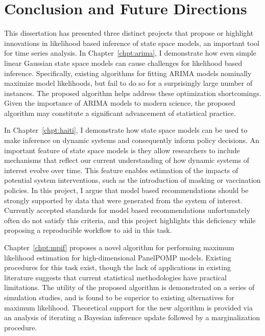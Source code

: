 \chapter{Conclusion and Future Directions}
\label{chpt:conclusion}

This dissertation has presented three distinct projects that propose or highlight innovations in likelihood based inference of state space models, an important tool for time series analysis.
In Chapter~\ref{chpt:arima}, I demonstrate how even simple linear Gaussian state space models can cause challenges for likelihood based inference.
Specifically, existing algorithms for fitting ARIMA models nominally maximize model likelihoods, but fail to do so for a surprisingly large number of instances.
The proposed algorithm helps address these optimization shortcomings.
Given the importance of ARIMA models to modern science, the proposed algorithm may constitute a significant advancement of statistical practice.

In Chapter~\ref{chpt:haiti}, I demonstrate how state space models can be used to make inference on dynamic systems and consequently inform policy decisions.
An important feature of state space models is they allow researchers to include mechanisms that reflect our current understanding of how dynamic systems of interest evolve over time.
This feature enables estimation of the impacts of potential system interventions, such as the introduction of masking or vaccination policies.
In this project, I argue that model based recommendations should be strongly supported by data that were generated from the system of interest.
Currently accepted standards for model based recommendations unfortunately often do not satisfy this criteria, and this project highlights this deficiency while proposing a reproducible workflow to aid in this task.

Chapter~\ref{chpt:mpif} proposes a novel algorithm for performing maximum likelihood estimation for high-dimensional PanelPOMP models.
Existing procedures for this task exist, though the lack of applications in existing literature suggests that current statistical methodologies have practical limitations.
The utility of the proposed algorithm is demonstrated on a series of simulation studies, and is found to be superior to existing alternatives for maximum likelihood.
Theoretical support for the new algorithm is provided via an analysis of iterating a Bayesian inference update followed by a marginalization procedure.

